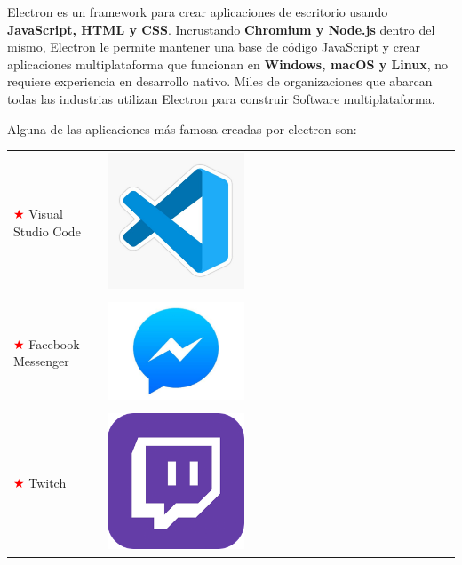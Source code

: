 
Electron es un framework para crear aplicaciones de escritorio usando \textbf{JavaScript, HTML y CSS}. Incrustando \textbf{Chromium y Node.js} dentro del mismo, Electron le permite mantener una base de código JavaScript y crear aplicaciones multiplataforma que funcionan en \textbf{ Windows, macOS y Linux}, no requiere experiencia en desarrollo nativo.
Miles de organizaciones que abarcan todas las industrias utilizan Electron para construir Software multiplataforma.\cite{elec}

Alguna de las aplicaciones más famosa creadas por electron son:

\begin{tabular}{l l}
    \textcolor{red}{ $\bigstar $} Visual Studio Code & \begin{minipage}{1.5cm}
     \includegraphics[width=0.4\textwidth]{img/code.jpg}
     \end{minipage}\\
     &\\
     \textcolor{red}{$\bigstar $} Facebook Messenger &\begin{minipage}{1.5cm}
      \includegraphics[width=0.4\textwidth]{img/faceme.jpg}
     \end{minipage}\\
     &\\
     \textcolor{red}{$\bigstar $} Twitch &\begin{minipage}{1.5cm}
     \includegraphics[width=0.4\textwidth]{img/twitch.png}
     \end{minipage}
\end{tabular}

